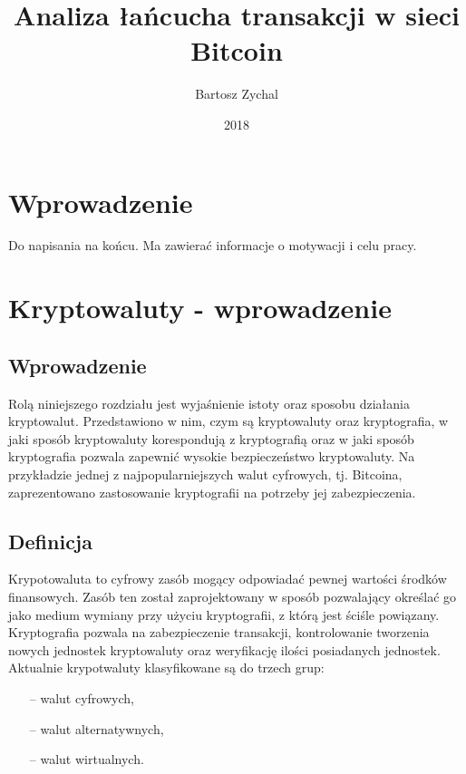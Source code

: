 \documentclass[12pt, twoside, final, openany]{mgr}
\title{Analiza łańcucha transakcji w sieci Bitcoin}
\author{Bartosz Zychal}
\date{2018} %
\begin{document}
\def\listtablename{Spis tabel. }
\def\tablename{Tabela. }
\maketitle %

\chapter*{Wprowadzenie}
Do napisania na końcu. Ma zawierać informacje o motywacji i celu pracy. 


\chapter{Kryptowaluty - wprowadzenie}

\section{Wprowadzenie} 
\label{sec:KryptowalutyWprowadzenie}
\indent Rolą niniejszego rozdziału jest wyjaśnienie istoty oraz sposobu działania kryptowalut. Przedstawiono w nim, czym są kryptowaluty oraz kryptografia, w jaki sposób kryptowaluty korespondują z kryptografią oraz w jaki sposób kryptografia pozwala zapewnić wysokie bezpieczeństwo kryptowaluty. Na przykładzie jednej z najpopularniejszych walut cyfrowych, tj. Bitcoina, zaprezentowano zastosowanie kryptografii na potrzeby jej zabezpieczenia.

\section{Definicja} \label{sec:definicjaKryptowaluty}
\indent Krypotowaluta to cyfrowy zasób mogący odpowiadać pewnej wartości środków finansowych. Zasób ten został zaprojektowany w sposób pozwalający określać go jako medium wymiany przy użyciu kryptografii, z którą jest ściśle powiązany. Kryptografia pozwala na zabezpieczenie transakcji, kontrolowanie tworzenia nowych jednostek kryptowaluty oraz weryfikację ilości posiadanych jednostek. Aktualnie krypotwaluty klasyfikowane są do trzech grup:
\begin{itemize}
\item[--] walut cyfrowych,
\item[--] walut alternatywnych,
\item[--] walut wirtualnych.
\end{itemize}
\end{document}
